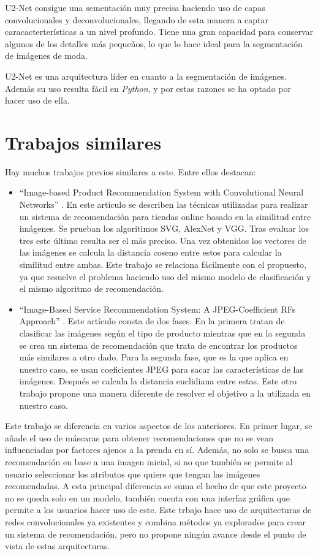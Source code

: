 \documentclass[12pt]{report} %
\begin{document}
	U2-Net consigue una sementación muy precisa haciendo uso de capas convolucionales y deconvolucionales, llegando de esta manera
	a captar caracacterterísticas a un nivel profundo. Tiene una gran capacidad para conservar algunos de los detalles más pequeños,
	lo que lo hace ideal para la segmentación de imágenes de moda. 


	U2-Net es una arquitectura líder en cuanto a la segmentación de imágenes. Además su uso resulta fácil en \textit{Python}, y
	por estas razones se ha optado por hacer uso de ella.


	\section{Trabajos similares}
	Hay muchos trabajos previos similares a este. Entre ellos destacan:
	\begin{itemize}
		\item ``Image-based Product Recommendation System with Convolutional Neural
		Networks'' \cite{stanford-paper}. En este artículo se describen las técnicas utilizadas para realizar un sistema de recomendación
		para tiendas online basado en la similitud entre imágenes. Se prueban los algoritimos SVG, AlexNet y VGG. Tras evaluar los tres
		este último resulta ser el más preciso. Una vez obtenidos los vectores de las imágenes se calcula la distancia coseno entre estos
		para calcular la similitud entre ambas. Este trabajo se relaciona fácilmente con el propuesto, ya que resuelve el problema haciendo uso del mismo
		modelo de clasificación y el mismo algoritmo de recomendación.
		\item ``Image-Based Service Recommendation System: A JPEG-Coefficient RFs Approach'' \cite{image-based-paper}. 
		Este artículo consta de dos fases. En la primera tratan de clasificar las imágenes según el tipo de producto mientras 
		que en la segunda se crea un sistema de recomendación que trata de encontrar los productos más similares a otro dado. 
		Para la segunda fase, que es la que aplica en nuestro caso, se usan coeficientes JPEG para sacar las 
		características de las imágenes. Después se calcula la distancia euclidiana entre estas. Este otro trabajo propone una
		manera diferente de resolver el objetivo a la utilizada en nuestro caso.
	\end{itemize}

	Este trabajo se diferencia en varios aspectos de los anteriores. En primer lugar, se añade el uso de máscaras para obtener recomendaciones
	que no se vean influenciadas por factores ajenos a la prenda en sí. Además, no solo se busca una recomendación en base a una imagen inicial,
	si no que también se permite al usuario seleccionar los atributos que quiere que tengan las imágenes recomendadas. A esta principal diferencia
	se suma el hecho de que este proyecto no se queda solo en un modelo, también
	cuenta con una interfaz gráfica que permite a los usuarios hacer uso de este. Este trbajo hace uso de arquitecturas de redes convolucionales ya existentes
	y combina métodos ya explorados para crear un sistema de recomendación, pero no propone ningún avance desde el punto de vista de estas arquitecturas.
\end{document}
